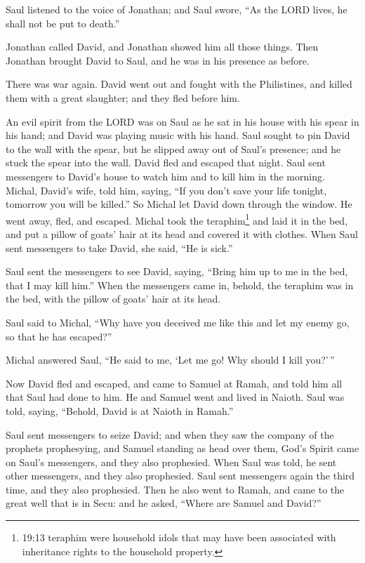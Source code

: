  Saul listened to the voice of Jonathan; and Saul swore,
``As the LORD lives, he shall not be put to death.''

 Jonathan called David, and Jonathan showed him all those
things. Then Jonathan brought David to Saul, and he was in his presence
as before.

 There was war again. David went out and fought with the
Philistines, and killed them with a great slaughter; and they fled
before him.

 An evil spirit from the LORD was on Saul as he sat in his
house with his spear in his hand; and David was playing music with his
hand.  Saul sought to pin David to the wall with the spear,
but he slipped away out of Saul's presence; and he stuck the spear into
the wall. David fled and escaped that night.  Saul sent
messengers to David's house to watch him and to kill him in the morning.
Michal, David's wife, told him, saying, ``If you don't save your life
tonight, tomorrow you will be killed.''  So Michal let
David down through the window. He went away, fled, and escaped.
 Michal took the teraphim\footnote{19:13 teraphim were
  household idols that may have been associated with inheritance rights
  to the household property.} and laid it in the bed, and put a pillow
of goats' hair at its head and covered it with clothes. 
When Saul sent messengers to take David, she said, ``He is sick.''

 Saul sent the messengers to see David, saying, ``Bring him
up to me in the bed, that I may kill him.''  When the
messengers came in, behold, the teraphim was in the bed, with the pillow
of goats' hair at its head.

 Saul said to Michal, ``Why have you deceived me like this
and let my enemy go, so that he has escaped?''

Michal answered Saul, ``He said to me, `Let me go! Why should I kill
you?'\,''

 Now David fled and escaped, and came to Samuel at Ramah,
and told him all that Saul had done to him. He and Samuel went and lived
in Naioth.  Saul was told, saying, ``Behold, David is at
Naioth in Ramah.''

 Saul sent messengers to seize David; and when they saw the
company of the prophets prophesying, and Samuel standing as head over
them, God's Spirit came on Saul's messengers, and they also prophesied.
 When Saul was told, he sent other messengers, and they
also prophesied. Saul sent messengers again the third time, and they
also prophesied.  Then he also went to Ramah, and came to
the great well that is in Secu: and he asked, ``Where are Samuel and
David?''

